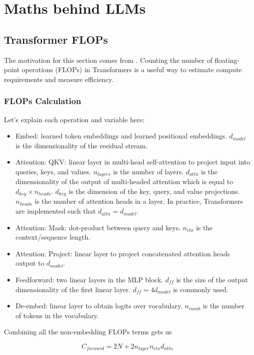 \chapter{Maths behind LLMs}
\section{Transformer FLOPs}
The motivation for this section comes from \cite{casson2023transformerflops}. Counting the number of floating-point operations (FLOPs) in Transformers is a useful way to estimate compute requirements and measure efficiency. 

\subsection{FLOPs Calculation}

Let's explain each operation and variable here:
\begin{itemize}
    \item Embed: learned token embeddings and learned positional embeddings. $d_{model}$ is the dimensionality of the residual stream.
    \item Attention: QKV: linear layer in multi-head self-attention to project input into queries, keys, and values. $n_{layers}$ is the number of layers. $d_{attn}$ is the dimensionality of the output of multi-headed attention which is equal to $d_{key} \times n_{heads}$. $d_{key}$ is the dimension of the key, query, and value projections. $n_{heads}$ is the number of attention heads in a layer. In practice, Transformers are implemented such that $d_{attn} = d_{model}$. 
    \item Attention: Mask: dot-product between query and keys. $n_{ctx}$ is the context/sequence length. 
    \item Attention: Project: linear layer to project concatenated attention heads output to $d_{model}$. 
    \item Feedforward: two linear layers in the MLP block. $d_{ff}$ is the size of the output dimensionality of the first linear layer. $d_{ff} = 4 d_{model}$ is commonly used. 
    \item De-embed: linear layer to obtain logits over vocabulary. $n_{vocab}$ is the number of tokens in the vocabulary. 
\end{itemize}


Combining all the non-embedding FLOPs terms gets us

\[C_{forward} = 2N + 2n_{layer} n_{ctx} d_{attn}\]

